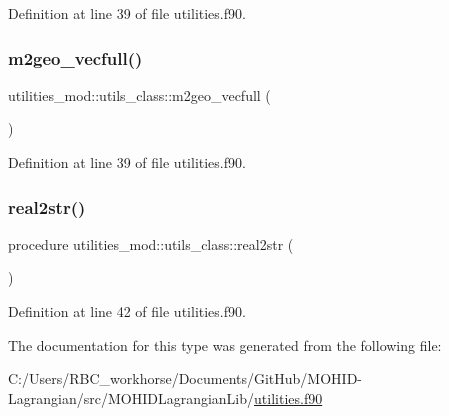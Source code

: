 Definition at line 39 of file utilities.\+f90.

\mbox{\label{structutilities__mod_1_1utils__class_a014536e96c18d67b0d8038c22d2d624a}} 
\subsubsection{\texorpdfstring{m2geo\+\_\+vecfull()}{m2geo\_vecfull()}}
{\footnotesize\ttfamily utilities\+\_\+mod\+::utils\+\_\+class\+::m2geo\+\_\+vecfull (\begin{DoxyParamCaption}{ }\end{DoxyParamCaption})\hspace{0.3cm}{\ttfamily [private]}}



Definition at line 39 of file utilities.\+f90.

\mbox{\label{structutilities__mod_1_1utils__class_a150e3763affd525139f135d6cbbca026}} 
\subsubsection{\texorpdfstring{real2str()}{real2str()}}
{\footnotesize\ttfamily procedure utilities\+\_\+mod\+::utils\+\_\+class\+::real2str (\begin{DoxyParamCaption}{ }\end{DoxyParamCaption})\hspace{0.3cm}{\ttfamily [private]}}



Definition at line 42 of file utilities.\+f90.



The documentation for this type was generated from the following file\+:\begin{DoxyCompactItemize}
\item 
C\+:/\+Users/\+R\+B\+C\+\_\+workhorse/\+Documents/\+Git\+Hub/\+M\+O\+H\+I\+D-\/\+Lagrangian/src/\+M\+O\+H\+I\+D\+Lagrangian\+Lib/\mbox{\hyperlink{utilities_8f90}{utilities.\+f90}}\end{DoxyCompactItemize}
